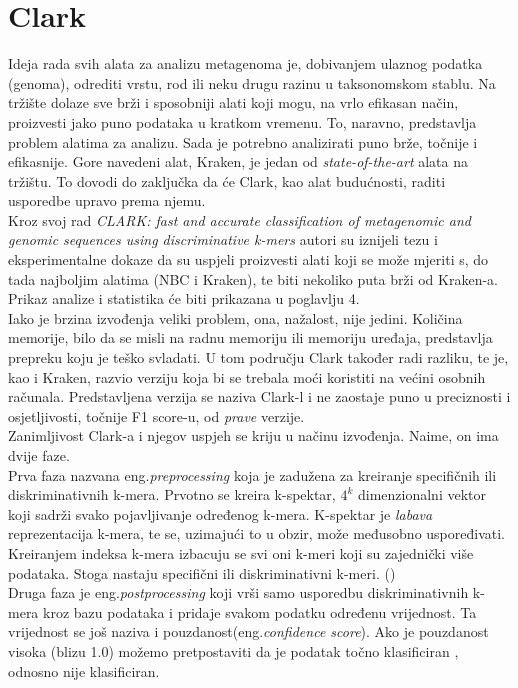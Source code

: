 \documentclass[times, utf8, seminar]{fer}
\begin{document}
\section{Clark}
Ideja rada svih alata za analizu metagenoma je, dobivanjem ulaznog podatka (genoma), odrediti vrstu, rod ili neku drugu razinu u taksonomskom stablu. Na tržište dolaze sve brži i sposobniji alati koji mogu, na vrlo efikasan način, proizvesti jako puno podataka u kratkom vremenu. To, naravno, predstavlja problem alatima za analizu. Sada je potrebno analizirati puno brže, točnije i efikasnije. Gore navedeni alat, Kraken, je jedan od \textit{state-of-the-art} alata na tržištu. To dovodi do zaključka da će Clark, kao alat budućnosti, raditi usporedbe upravo prema njemu.
\\Kroz svoj rad \textit{CLARK: fast and accurate classification of metagenomic and genomic sequences using discriminative k-mers} autori su iznijeli tezu i eksperimentalne dokaze da su uspjeli proizvesti alati koji se može mjeriti s, do tada najboljim alatima (NBC i Kraken), te biti nekoliko puta brži od Kraken-a. Prikaz analize i statistika će biti prikazana u poglavlju 4.
\\Iako je brzina izvođenja veliki problem, ona, nažalost, nije jedini. Količina memorije, bilo da se misli na radnu memoriju ili memoriju uređaja, predstavlja prepreku koju je teško svladati. U tom području Clark također radi razliku, te je, kao i Kraken, razvio verziju koja bi se trebala moći koristiti na većini osobnih računala. Predstavljena verzija se naziva Clark-l i ne zaostaje puno u preciznosti i osjetljivosti, točnije F1 score-u, od \textit{prave} verzije.
\\Zanimljivost Clark-a i njegov uspjeh se kriju u načinu izvođenja. Naime, on ima dvije faze. \\Prva faza nazvana eng.\textit{preprocessing} koja je zadužena za kreiranje specifičnih ili diskriminativnih k-mera. Prvotno se kreira k-spektar, ${4}^{k}$ dimenzionalni vektor koji sadrži svako pojavljivanje određenog k-mera. K-spektar je \textit{labava} reprezentacija k-mera, te se, uzimajući to u obzir, može međusobno uspoređivati. Kreiranjem indeksa k-mera izbacuju se svi oni k-meri koji su zajednički više podataka. Stoga nastaju specifični ili diskriminativni k-meri. (\cite{CLARK})
\\Druga faza je eng.\textit{postprocessing} koji vrši samo usporedbu diskriminativnih k-mera kroz bazu podataka i pridaje svakom podatku određenu vrijednost. Ta vrijednost se još naziva i pouzdanost(eng.\textit{confidence score}). Ako je pouzdanost visoka (blizu 1.0) možemo pretpostaviti da je podatak točno klasificiran , odnosno nije klasificiran.
\end{document}
